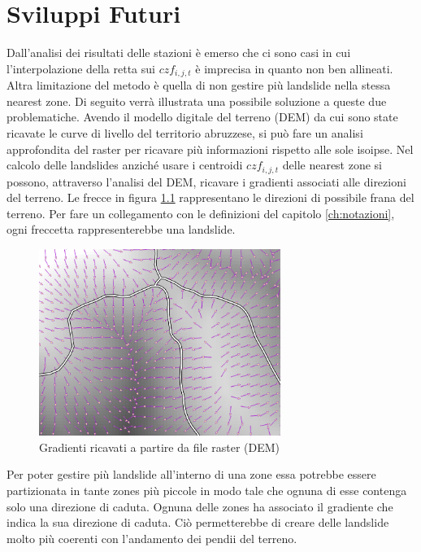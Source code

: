 
\chapter{Sviluppi Futuri} 
Dall'analisi dei risultati delle stazioni è emerso che 
ci sono casi in cui l'interpolazione della retta sui $czf_{i,j,t}$ è imprecisa in quanto non ben allineati.
Altra limitazione del metodo è quella di non gestire più landslide nella stessa nearest zone.
Di seguito verrà illustrata una possibile soluzione a queste due problematiche. Avendo il modello digitale del terreno (DEM) da cui sono state ricavate le curve di livello del territorio abruzzese, si può fare un analisi approfondita del raster per ricavare più informazioni rispetto alle sole isoipse.   
Nel calcolo delle landslides anziché usare i centroidi $czf_{i,j,t}$ delle nearest zone si possono, attraverso l'analisi del DEM, ricavare i gradienti associati alle direzioni del terreno.
Le frecce in figura \ref{fig:gradienti}  rappresentano le direzioni di possibile frana del terreno. Per fare un collegamento con le definizioni del capitolo \ref{ch:notazioni}, ogni freccetta rappresenterebbe una landslide. \cite{gradienti}

\begin{figure}[H]
	\centering
	\includegraphics[width=0.7\textwidth]{images/gradienti.png}
	\caption{Gradienti ricavati a partire da file raster (DEM)}
	\label{fig:gradienti}
\end{figure}
Per poter gestire più landslide all'interno di una zone essa potrebbe essere partizionata in tante zones più piccole in modo tale che ognuna di esse contenga solo una direzione di caduta.
Ognuna delle zones ha associato il gradiente che indica la sua direzione di caduta.
Ciò permetterebbe di creare delle landslide molto più coerenti con l'andamento dei pendii del terreno.
 


